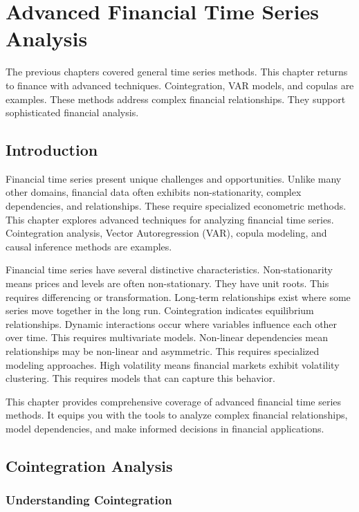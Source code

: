 \chapter{Advanced Financial Time Series Analysis}

The previous chapters covered general time series methods. This chapter returns to finance with advanced techniques. Cointegration, VAR models, and copulas are examples. These methods address complex financial relationships. They support sophisticated financial analysis.

\section{Introduction}

Financial time series present unique challenges and opportunities. Unlike many other domains, financial data often exhibits non-stationarity, complex dependencies, and relationships. These require specialized econometric methods. This chapter explores advanced techniques for analyzing financial time series. Cointegration analysis, Vector Autoregression (VAR), copula modeling, and causal inference methods are examples.

Financial time series have several distinctive characteristics. Non-stationarity means prices and levels are often non-stationary. They have unit roots. This requires differencing or transformation. Long-term relationships exist where some series move together in the long run. Cointegration indicates equilibrium relationships. Dynamic interactions occur where variables influence each other over time. This requires multivariate models. Non-linear dependencies mean relationships may be non-linear and asymmetric. This requires specialized modeling approaches. High volatility means financial markets exhibit volatility clustering. This requires models that can capture this behavior.

This chapter provides comprehensive coverage of advanced financial time series methods. It equips you with the tools to analyze complex financial relationships, model dependencies, and make informed decisions in financial applications.

\section{Cointegration Analysis}

\subsection{Understanding Cointegration}

